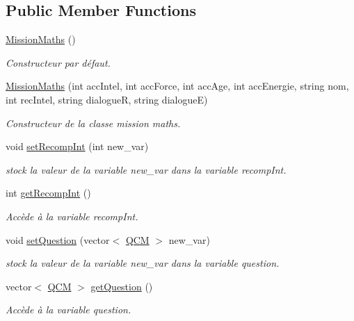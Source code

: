 \subsection*{Public Member Functions}
\begin{DoxyCompactItemize}
\item 
\hyperlink{class_mission_maths_abe58873e14c757c086ecaf42e581dd20}{Mission\-Maths} ()
\begin{DoxyCompactList}\small\item\em Constructeur par défaut. \end{DoxyCompactList}\item 
\hyperlink{class_mission_maths_afd5e073b7a77121cf692925f71b27959}{Mission\-Maths} (int acc\-Intel, int acc\-Force, int acc\-Age, int acc\-Energie, string nom, int rec\-Intel, string dialogue\-R, string dialogue\-E)
\begin{DoxyCompactList}\small\item\em Constructeur de la classe mission maths. \end{DoxyCompactList}\item 
void \hyperlink{class_mission_maths_a29c16120131c778ab70c67f26252ff0c}{set\-Recomp\-Int} (int new\-\_\-var)
\begin{DoxyCompactList}\small\item\em stock la valeur de la variable new\-\_\-var dans la variable recomp\-Int. \end{DoxyCompactList}\item 
int \hyperlink{class_mission_maths_a43e24544f6550d8acffb0fd19eefe3a5}{get\-Recomp\-Int} ()
\begin{DoxyCompactList}\small\item\em Accède à la variable recomp\-Int. \end{DoxyCompactList}\item 
void \hyperlink{class_mission_maths_a07c256993831514508290420b4b57bcf}{set\-Question} (vector$<$ \hyperlink{struct_q_c_m}{Q\-C\-M} $>$ new\-\_\-var)
\begin{DoxyCompactList}\small\item\em stock la valeur de la variable new\-\_\-var dans la variable question. \end{DoxyCompactList}\item 
vector$<$ \hyperlink{struct_q_c_m}{Q\-C\-M} $>$ \hyperlink{class_mission_maths_a719d59e5c73f690c92417863cec4e747}{get\-Question} ()
\begin{DoxyCompactList}\small\item\em Accède à la variable question. \end{DoxyCompactList}\item 

\end{DoxyCompactItemize}
